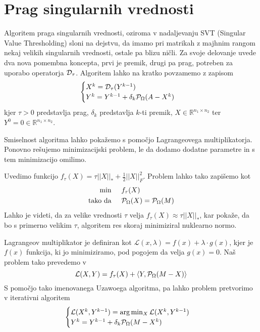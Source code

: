 \section{Prag singularnih vrednosti}

Algoritem praga singularnih vrednosti, oziroma v nadaljevanju SVT (Singular Value Thresholding) sloni na dejstvu, da imamo pri matrikah z majhnim rangom nekaj velikih singularnih vrednosti, ostale pa blizu ničli. Za svoje delovanje uvede dva nova pomembna koncepta, prvi je premik, drugi pa prag, potreben za uporabo operatorja $\mathcal{D}_\tau$. Algoritem lahko na kratko povzamemo z zapisom
\[
    \begin{cases}
        X^k = \mathcal{D}_\tau(Y^{k-1}) \\
        Y^k = Y^{k-1} + \delta_k \mathcal{P}_\Omega(A - X^k) 
    \end{cases}
\]
kjer $\tau > 0$ predstavlja prag, $\delta_k$ predstavlja $k$-ti premik, $X \in \mathbb{R}^{n_1 \times n_2}$ ter
$Y^0 = 0 \in \mathbb{R}^{n_1 \times n_2}$. \cite{CCS}

Smiselnost algoritma lahko pokažemo s pomočjo Lagrangeovega multiplikatorja. Ponovno rešujemo minimizacijski problem, le da dodamo dodatne parametre in s tem minimizacijo omilimo. 

Uvedimo funkcijo $f_\tau(X) = \tau||X||_* + \frac{1}{2}||X||^2_F$. Problem lahko tako zapišemo kot 
\begin{align*}
    \textrm{min} & \hspace{0.5cm} f_\tau(X) \\
    \textrm{tako da} & \hspace{0.5cm} \mathcal{P}_\Omega(X) = \mathcal{P}_\Omega(M)
\end{align*}
Lahko je videti, da za velike vrednosti $\tau$ velja $f_\tau(X) \approx \tau||X||_*$, kar pokaže, da bo s primerno velikim $\tau$, algoritem res skoraj minimiziral nuklearno normo.

Lagrangeov multiplikator je definiran kot $\mathcal{L}(x, \lambda) = f(x) + \lambda \cdot g(x)$, kjer je $f(x)$ funkcija, ki jo minimiziramo, pod pogojem da velja $g(x) = 0$. Naš problem tako prevedemo v
\[
    \mathcal{L}(X, Y) = f_\tau(X) + \left< Y, \mathcal{P}_\Omega(M - X) \right>
\] 
S pomočjo tako imenovanega Uzawoega algoritma, pa lahko problem pretvorimo v iterativni algoritem 
\[
    \begin{cases}
        \mathcal{L}(X^k, Y^{k-1}) =  \arg \min_{X} \mathcal{L}(X^k, Y^{k-1}) \\
        Y^k = Y^{k-1} + \delta_k \mathcal{P}_\Omega(M - X^k) 
    \end{cases}
\] \cite{CCS}

